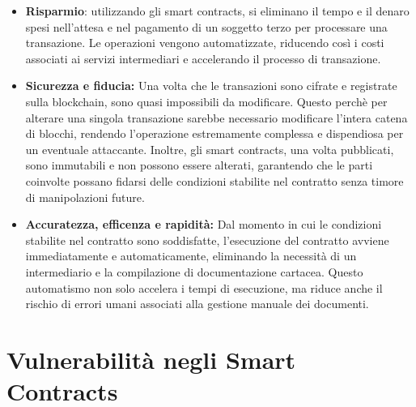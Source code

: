 \documentclass[../../Thesis.tex]{subfiles}
\begin{document}
\begin{itemize}
    \item \textbf{Risparmio}: utilizzando gli smart contracts, si eliminano il tempo e il denaro spesi nell'attesa e nel pagamento di un soggetto terzo per processare una transazione. Le operazioni vengono automatizzate, riducendo cos\`i i costi associati ai servizi intermediari e accelerando il processo di transazione.
    \item \textbf{Sicurezza e fiducia:} Una volta che le transazioni sono cifrate e registrate sulla blockchain, sono quasi impossibili da modificare. Questo perch\`e per alterare una singola transazione sarebbe necessario modificare l'intera catena di blocchi, rendendo l'operazione estremamente complessa e dispendiosa per un eventuale attaccante. Inoltre, gli smart contracts, una volta pubblicati, sono immutabili e non possono essere alterati, garantendo che le parti coinvolte possano fidarsi delle condizioni stabilite nel contratto senza timore di manipolazioni future.
    \item \textbf{Accuratezza, efficenza e rapidit\`a:} Dal momento in cui le condizioni stabilite nel contratto sono soddisfatte, l'esecuzione del contratto avviene immediatamente e automaticamente, eliminando la necessit\`a di un intermediario e la compilazione di documentazione cartacea. Questo automatismo non solo accelera i tempi di esecuzione, ma riduce anche il rischio di errori umani associati alla gestione manuale dei documenti.
    
\end{itemize}
\section{Vulnerabilit\`a negli Smart Contracts}
\end{document}
